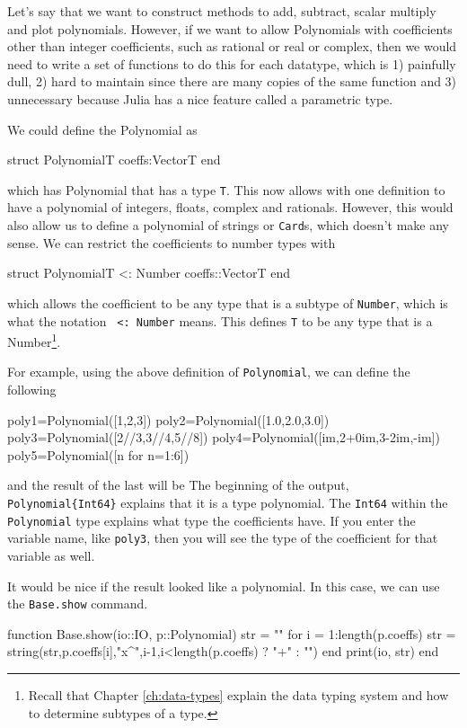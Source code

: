 Let's say that we want to construct methods to add, subtract, scalar multiply and plot polynomials.  However, if we want to allow Polynomials with coefficients other than integer coefficients, such as rational or real or complex, then we would need to write a set of functions to do this for each datatype, which is 1) painfully dull, 2) hard to maintain since there are many copies of the same function and 3) unnecessary because Julia has a nice feature called a parametric type. 

We could define the Polynomial as 
\begin{jlverbatim}[poly]
struct Polynomial{T}
  coeffs:Vector{T}
end
\end{jlverbatim}
%
which has Polynomial that has a type \verb!T!. This now allows with one definition to have a polynomial of integers, floats, complex and rationals.  However, this would also allow us to define a polynomial of strings or \texttt{Card}s, which doesn't make any sense.  We can restrict the coefficients to number types with 
%
\begin{jlblock}[poly]
struct Polynomial{T <: Number}
  coeffs::Vector{T}
end
\end{jlblock}
%
which allows the coefficient to be any type that is a subtype of \texttt{Number}, which is what the notation \texttt{ <: Number} means.  This defines \texttt{T} to be any type that is a Number\footnote{Recall that Chapter \ref{ch:data-types} explain the data typing system and how to determine subtypes of a type.}.  

For example, using the above definition of \texttt{Polynomial}, we can define the following
%
\begin{jlblock}[poly]
poly1=Polynomial([1,2,3])
poly2=Polynomial([1.0,2.0,3.0])
poly3=Polynomial([2//3,3//4,5//8])
poly4=Polynomial([im,2+0im,3-2im,-im])
poly5=Polynomial([n for n=1:6])
\end{jlblock}
%
and the result of the last will be  \printpythontex[verbatim]
%
The beginning of the output, \verb|Polynomial{Int64}| explains that it is a type polynomial.  The \texttt{Int64} within the \texttt{Polynomial} type explains what type the coefficients have.  If you enter the variable name, like \texttt{poly3}, then you will see the type of the coefficient for that variable as well. 

It would be nice if the result looked like a polynomial. In this case,
we can use the \texttt{Base.show} command.


\begin{jlblock}[poly]
function Base.show(io::IO, p::Polynomial)
  str = ""
  for i = 1:length(p.coeffs)
      str = string(str,p.coeffs[i],"x^",i-1,i<length(p.coeffs) ? "+" : "")
  end
  print(io, str)
end
\end{jlblock}
%

